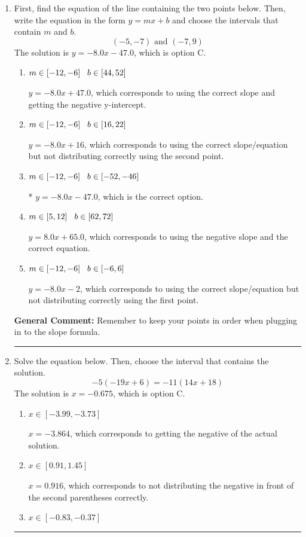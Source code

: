 \documentclass{extbook}[14pt]
\newcommand{\litem}[1]{\item #1

\rule{\textwidth}{0.4pt}}
\begin{document}
\begin{enumerate}\litem{
First, find the equation of the line containing the two points below. Then, write the equation in the form $ y=mx+b $ and choose the intervals that contain $m$ and $b$.
\[ (-5, -7) \text{ and } (-7, 9) \]The solution is \( y = -8.0x -47.0 \), which is option C.\begin{enumerate}[label=\Alph*.]
\item \( m \in [-12, -6] \hspace*{3mm} b \in [44, 52] \)

 $y = -8.0x + 47.0$, which corresponds to using the correct slope and getting the negative y-intercept.
\item \( m \in [-12, -6] \hspace*{3mm} b \in [16, 22] \)

 $y = -8.0x + 16$, which corresponds to using the correct slope/equation but not distributing correctly using the second point.
\item \( m \in [-12, -6] \hspace*{3mm} b \in [-52, -46] \)

* $y = -8.0x -47.0$, which is the correct option.
\item \( m \in [5, 12] \hspace*{3mm} b \in [62, 72] \)

 $y = 8.0x + 65.0$, which corresponds to using the negative slope and the correct equation.
\item \( m \in [-12, -6] \hspace*{3mm} b \in [-6, 6] \)

 $y = -8.0x -2$, which corresponds to using the correct slope/equation but not distributing correctly using the first point.
\end{enumerate}

\textbf{General Comment:} Remember to keep your points in order when plugging in to the slope formula.
}
\litem{
Solve the equation below. Then, choose the interval that contains the solution.
\[ -5(-19x + 6) = -11(14x + 18) \]The solution is \( x = -0.675 \), which is option C.\begin{enumerate}[label=\Alph*.]
\item \( x \in [-3.99, -3.73] \)

$x = -3.864$, which corresponds to getting the negative of the actual solution.
\item \( x \in [0.91, 1.45] \)

$x = 0.916$, which corresponds to not distributing the negative in front of the second parentheses correctly.
\item \( x \in [-0.83, -0.37] \)


\end{enumerate}}
\end{enumerate}
\end{document}

